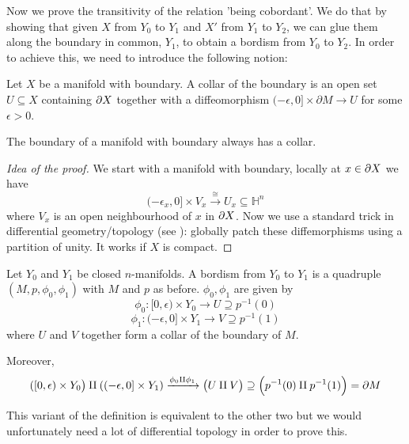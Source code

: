 \noindent Now we prove the transitivity of the relation 'being cobordant'. We do that by showing that given $X$ from $Y_0$ to $Y_1$ and $X'$ from $Y_1$ to $Y_2$, we can glue them along the boundary in common, $Y_1$, to obtain a bordism from $Y_0$ to $Y_2$. %
In order to achieve this, we need to introduce the following notion:
\begin{defn}
    Let $X$ be a manifold with boundary. A collar of the boundary is an open set  $U\subseteq X$ containing $\partial X$ together with a diffeomorphism  $(-\epsilon,0]\times\partial M \to U$ for some $\epsilon>0$.
\end{defn}
\begin{thm}
    The boundary of a manifold with boundary always has a collar.
\end{thm}
\begin{proof}[Idea of the proof]
    We start with a manifold with boundary, locally at $x\in\partial X$ we have 
    $$(-\epsilon_x, 0]\times V_x\xrightarrow{\cong} U_x\subseteq\mathbb{H}^n$$
    where $V_x$ is an open neighbourhood of $x$ in $\partial X$.
    \noindent Now we use a standard trick in differential geometry/topology (see \cite{Hirsch1976}): globally patch these diffemorphisms using a partition of unity. It works if $X$ is compact.
\end{proof}

\begin{defn}
    Let $Y_0$ and $Y_1$ be closed $n$-manifolds. A bordism from $Y_0$ to $Y_1$ is a quadruple $(M, p, \phi_0, \phi_1)$ with $M$ and $p$ as before. $\phi_0, \phi_1$ are given by
    $$\phi_0:[0, \epsilon)\times Y_0\to U \supseteq p^{-1}(0)$$
    $$\phi_1:(-\epsilon, 0]\times Y_1\to V \supseteq p^{-1}(1)$$
    where $U$ and $V$ together form a collar of the boundary of $M$.
\end{defn}

\noindent Moreover, 
$$([0, \epsilon)\times Y_0\big)\amalg((-\epsilon, 0]\times Y_1)\xrightarrow{\phi_0\amalg\phi_1}
\big(U\amalg V\big)\supseteq 
\Big(p^{-1}(0)\amalg p^{-1}(1)\Big)=\partial M$$

\noindent This variant of the definition is equivalent to the other two but we would unfortunately need a lot of differential topology in order to prove this.

